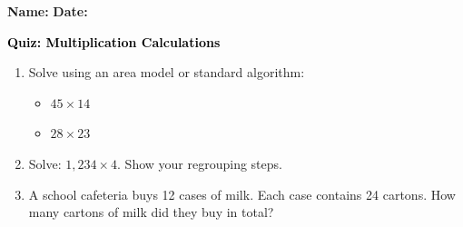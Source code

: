 \documentclass[12pt, letterpaper, fleqn]{article}
\begin{document}
\textbf{Name:} \underline{\hspace{5cm}}
\hfill
\textbf{Date:} \underline{\hspace{3cm}}\\

\begin{tcolorbox}[colback=customteal!20]
    \large\textcolor{black}{\textbf{Quiz: Multiplication Calculations}}
\end{tcolorbox}

\vspace{5mm}
\begin{enumerate}[itemsep=3cm, leftmargin=0.6cm]
\item Solve using an area model or standard algorithm:
  \begin{itemize}[itemsep=1cm]
    \item $45 \times 14$
    \vspace{3cm}
    \item $28 \times 23$
    \vspace{3cm}
  \end{itemize}

\item Solve: $1,234 \times 4$. Show your regrouping steps.
\vspace{3cm}

\item A school cafeteria buys 12 cases of milk. Each case contains 24 cartons. How many cartons of milk did they buy in total?
\end{enumerate}
\end{document}
